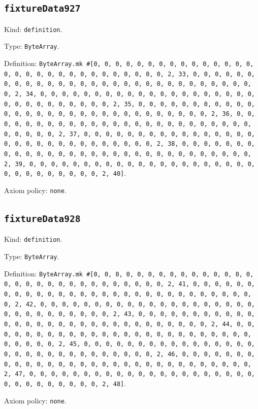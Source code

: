 \documentclass[11pt]{article}
\begin{document}
\subsection*{\texttt{fixtureData927}}
\noindent Kind: \texttt{definition}.\par
\noindent Type: \texttt{ByteArray}.\par
\noindent Definition: \texttt{ByteArray.mk \#[0, 0, 0, 0, 0, 0, 0, 0, 0, 0, 0, 0, 0, 0, 0, 0, 0, 0, 0, 0, 0, 0, 0, 0, 0, 0, 0, 0, 0, 0, 2, 33, 0, 0, 0, 0, 0, 0, 0, 0, 0, 0, 0, 0, 0, 0, 0, 0, 0, 0, 0, 0, 0, 0, 0, 0, 0, 0, 0, 0, 0, 0, 2, 34, 0, 0, 0, 0, 0, 0, 0, 0, 0, 0, 0, 0, 0, 0, 0, 0, 0, 0, 0, 0, 0, 0, 0, 0, 0, 0, 0, 0, 0, 0, 2, 35, 0, 0, 0, 0, 0, 0, 0, 0, 0, 0, 0, 0, 0, 0, 0, 0, 0, 0, 0, 0, 0, 0, 0, 0, 0, 0, 0, 0, 0, 0, 2, 36, 0, 0, 0, 0, 0, 0, 0, 0, 0, 0, 0, 0, 0, 0, 0, 0, 0, 0, 0, 0, 0, 0, 0, 0, 0, 0, 0, 0, 0, 0, 2, 37, 0, 0, 0, 0, 0, 0, 0, 0, 0, 0, 0, 0, 0, 0, 0, 0, 0, 0, 0, 0, 0, 0, 0, 0, 0, 0, 0, 0, 0, 0, 2, 38, 0, 0, 0, 0, 0, 0, 0, 0, 0, 0, 0, 0, 0, 0, 0, 0, 0, 0, 0, 0, 0, 0, 0, 0, 0, 0, 0, 0, 0, 0, 2, 39, 0, 0, 0, 0, 0, 0, 0, 0, 0, 0, 0, 0, 0, 0, 0, 0, 0, 0, 0, 0, 0, 0, 0, 0, 0, 0, 0, 0, 0, 0, 2, 40]}.\par
\noindent Axiom policy: \texttt{none}.\par
\subsection*{\texttt{fixtureData928}}
\noindent Kind: \texttt{definition}.\par
\noindent Type: \texttt{ByteArray}.\par
\noindent Definition: \texttt{ByteArray.mk \#[0, 0, 0, 0, 0, 0, 0, 0, 0, 0, 0, 0, 0, 0, 0, 0, 0, 0, 0, 0, 0, 0, 0, 0, 0, 0, 0, 0, 0, 0, 2, 41, 0, 0, 0, 0, 0, 0, 0, 0, 0, 0, 0, 0, 0, 0, 0, 0, 0, 0, 0, 0, 0, 0, 0, 0, 0, 0, 0, 0, 0, 0, 2, 42, 0, 0, 0, 0, 0, 0, 0, 0, 0, 0, 0, 0, 0, 0, 0, 0, 0, 0, 0, 0, 0, 0, 0, 0, 0, 0, 0, 0, 0, 0, 2, 43, 0, 0, 0, 0, 0, 0, 0, 0, 0, 0, 0, 0, 0, 0, 0, 0, 0, 0, 0, 0, 0, 0, 0, 0, 0, 0, 0, 0, 0, 0, 2, 44, 0, 0, 0, 0, 0, 0, 0, 0, 0, 0, 0, 0, 0, 0, 0, 0, 0, 0, 0, 0, 0, 0, 0, 0, 0, 0, 0, 0, 0, 0, 2, 45, 0, 0, 0, 0, 0, 0, 0, 0, 0, 0, 0, 0, 0, 0, 0, 0, 0, 0, 0, 0, 0, 0, 0, 0, 0, 0, 0, 0, 0, 0, 2, 46, 0, 0, 0, 0, 0, 0, 0, 0, 0, 0, 0, 0, 0, 0, 0, 0, 0, 0, 0, 0, 0, 0, 0, 0, 0, 0, 0, 0, 0, 0, 2, 47, 0, 0, 0, 0, 0, 0, 0, 0, 0, 0, 0, 0, 0, 0, 0, 0, 0, 0, 0, 0, 0, 0, 0, 0, 0, 0, 0, 0, 0, 0, 2, 48]}.\par
\noindent Axiom policy: \texttt{none}.\par
\end{document}
